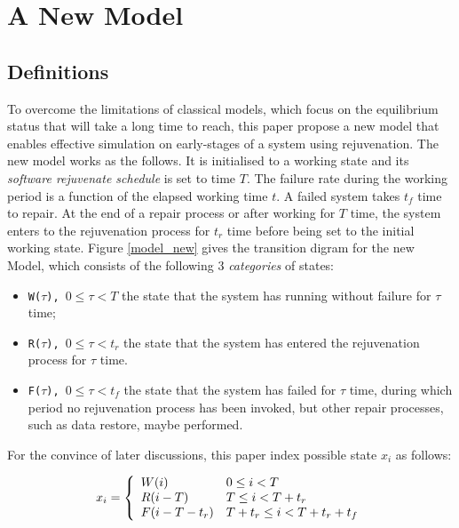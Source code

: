 \section{A New Model}

\subsection{Definitions}

To overcome the limitations of classical models, which focus on the 
equilibrium status that will take a long time to reach, this paper propose a
new model that enables effective simulation on early-stages of a system using 
rejuvenation.  The new model works as the follows. It is initialised to a 
working state and its {\it software rejuvenate schedule} is set to time $T$.  
The failure rate during the working period is a function of the elapsed working 
time $t$.  A failed system takes $t_f$ time to repair.  At the end of a repair 
process or after working for $T$ time, the system enters to the rejuvenation 
process for $t_r$ time before being set to the initial working state.  Figure 
\ref{model_new} gives the transition digram for the new Model, which consists 
of  the following 3 {\it categories} of states:

\begin{itemize}
 \item {\tt W($\tau$), $0 \leq \tau < T$} the state that the system has running 
without failure for $\tau$ time;
 \item {\tt R($\tau$), $0 \leq \tau < t_r$} the state that the system has 
entered 
the rejuvenation process for $\tau$ time.
 \item {\tt F($\tau$), $0 \leq \tau < t_f$} the state that the system has 
failed 
for $\tau$ time, during which period no rejuvenation process has been invoked, 
but other repair processes, such as data restore, maybe performed.
\end{itemize}

For the convince of later discussions, this paper index possible state $x_i$ as 
follows:

\begin{defn}
\[ x_i = \left\{ 
  \begin{array}{l l}
    W(i)    &   0 \leq i < T \\
    R(i-T) &   T \leq i < T+t_r \\ 
    F(i-T-t_r) &   T+t_r \leq i < T+t_r+t_f \\     
  \end{array} \right.\]
\end{defn}

